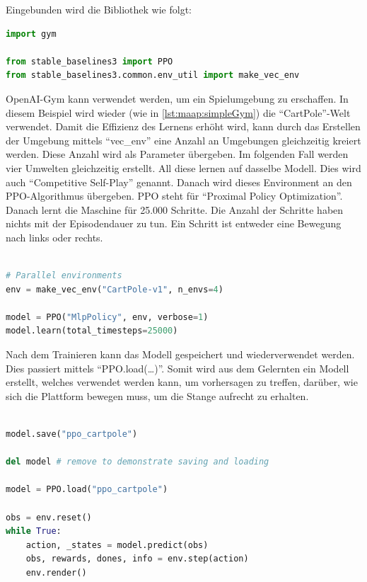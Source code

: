 Eingebunden wird die Bibliothek wie folgt:
\begin{lstlisting}[language=Python,label=lst:maap:pposampleone,caption=Stable-Baselines3 Beispiel]
import gym

from stable_baselines3 import PPO
from stable_baselines3.common.env_util import make_vec_env

\end{lstlisting}

OpenAI-Gym kann verwendet werden, um ein Spielumgebung zu erschaffen. In diesem Beispiel wird wieder (wie in \ref{lst:maap:simpleGym}) die ``CartPole''-Welt verwendet. Damit die Effizienz des Lernens erhöht wird, kann durch das Erstellen der Umgebung mittels ``vec\_env'' eine Anzahl an Umgebungen gleichzeitig kreiert werden. Diese Anzahl wird als Parameter übergeben. Im folgenden Fall werden vier Umwelten gleichzeitig erstellt. All diese lernen auf dasselbe Modell. Dies wird auch ``Competitive Self-Play'' genannt. Danach wird dieses Environment an den PPO-Algorithmus übergeben. PPO steht für ``Proximal Policy Optimization''. Danach lernt die Maschine für 25.000 Schritte. Die Anzahl der Schritte haben nichts mit der Episodendauer zu tun. Ein Schritt ist entweder eine Bewegung nach links oder rechts.


\begin{lstlisting}[language=Python,firstnumber=6]

# Parallel environments
env = make_vec_env("CartPole-v1", n_envs=4)

model = PPO("MlpPolicy", env, verbose=1)
model.learn(total_timesteps=25000)
\end{lstlisting}

Nach dem Trainieren kann das Modell gespeichert und wiederverwendet werden. Dies passiert mittels ``PPO.load(\dots)''. Somit wird aus dem Gelernten ein Modell erstellt, welches verwendet werden kann, um vorhersagen zu treffen, darüber, wie sich die Plattform bewegen muss, um die Stange aufrecht zu erhalten.

\begin{lstlisting}[language=Python,firstnumber=12]

model.save("ppo_cartpole")

del model # remove to demonstrate saving and loading

model = PPO.load("ppo_cartpole")

obs = env.reset()
while True:
    action, _states = model.predict(obs)
    obs, rewards, dones, info = env.step(action)
    env.render()
\end{lstlisting}

